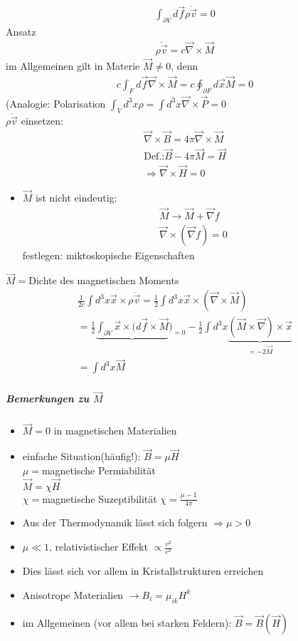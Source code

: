 \documentclass[a4paper]{article}
\begin{document}
\begin{align}
\int_{\partial V} d\vec{f} \overline{\rho \vec{v}}=0
\end{align}
Ansatz
\begin{align}
\overline{\rho \vec{v}}=c\vec{\nabla}\times\vec{M}
\end{align}
im Allgemeinen gilt in Materie $\vec{M}\neq0$, denn
\begin{align}
c \int_{F} d\vec{f} \vec{\nabla}\times\vec{M}=c \oint_{\partial F} d\vec{x}
\vec{M}=0
\end{align}
(Analogie: Polarisation $\int_V d^3x\rho=\int d^3x\vec{\nabla}\times\vec{P}=0$\\
$\overline{\rho \vec{v}}$ einsetzen:
\begin{align}
\vec{\nabla}\times\vec{B}=4\pi \vec{\nabla}\times\vec{M}\\
\text{Def.:} \vec{B}-4\pi\vec{M}=\vec{H}\\
\Rightarrow \vec{\nabla}\times\vec{H}=0
\end{align}
\begin{itemize}
\item $\vec{M}$ ist nicht eindeutig:
\begin{align}
\vec{M}\rightarrow\vec{M}+\vec{\nabla}f\\
\vec{\nabla}\times(\vec{\nabla}f)=0
\end{align}
festlegen: miktoskopische Eigenschaften
\end{itemize}
$\vec{M}=$Dichte des magnetischen Moments
\begin{align}
\frac{1}{2c}\int d^3x \vec{x}\times\overline{\rho\vec{v}}=\frac{1}{2}\int d^3x
\vec{x}\times(\vec{\nabla}\times\vec{M})\\
=\frac{1}{2}\underbrace{\int_{\partial V}
\vec{x}\times(d\vec{f}\times\vec{M}})_{=0}-\frac{1}{2}\int d^3x
\underbrace{(\vec{M}\times\vec{\nabla})\times\vec{x}}_{=-2\vec{M}}\\
=\int d^3x \vec{M}
\end{align}
\subparagraph{Bemerkungen zu $\vec{M}$}
\begin{itemize}
\item $\vec{M}=0$ in magnetischen Materialien
\item einfache Situation(häufig!): $\vec{B}=\mu\vec{H}$\\
$\mu=$magnetische Permiabilität\\
$\vec{M}=\chi\vec{H}$\\
$\chi=$magnetische Suzeptibilität $\chi=\frac{\mu-1}{4\pi}$
\item Aus der Thermodynamik lässt sich folgern $\Rightarrow \mu>0$
\item $\mu \ll 1$, relativistischer Effekt $\propto \frac{v^2}{c^2}$
\item Dies lässt sich vor allem in Kristallstrukturen erreichen
\item Anisotrope Materialien $\rightarrow B_i=\mu_{ik}H^k$
\item im Allgemeinen (vor allem bei starken Feldern): $\vec{B}=\vec{B}(\vec{H})$
\end{itemize}
\end{document}
